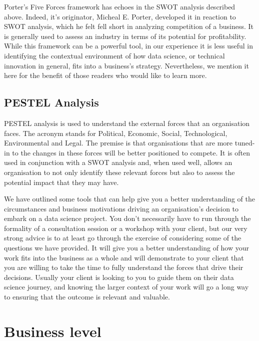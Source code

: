\documentclass[
]{book}
\begin{document}
Porter's Five Forces framework has echoes in the SWOT analysis described above. Indeed, it's originator, Micheal E. Porter, developed it in reaction to SWOT analysis, which he felt fell short in analyzing competition of a business. It is generally used to assess an industry in terms of its potential for profitability. While this framework can be a powerful tool, in our experience it is less useful in identifying the contextual environment of how data science, or technical innovation in general, fits into a business's strategy. Nevertheless, we mention it here for the benefit of those readers who would like to learn more.

\hypertarget{pestel-analysis}{%
\subsection{PESTEL Analysis}\label{pestel-analysis}}

PESTEL analysis is used to understand the external forces that an organisation faces. The acronym stands for Political, Economic, Social, Technological, Environmental and Legal. The premise is that organisations that are more tuned-in to the changes in these forces will be better positioned to compete. It is often used in conjunction with a SWOT analysis and, when used well, allows an organisation to not only identify these relevant forces but also to assess the potential impact that they may have.

We have outlined some tools that can help give you a better understanding of the circumstances and business motivations driving an organisation's decision to embark on a data science project. You don't necessarily have to run through the formality of a consultation session or a workshop with your client, but our very strong advice is to at least go through the exercise of considering some of the questions we have provided. It will give you a better understanding of how your work fits into the business as a whole and will demonstrate to your client that you are willing to take the time to fully understand the forces that drive their decisions. Usually your client is looking to you to guide them on their data science journey, and knowing the larger context of your work will go a long way to ensuring that the outcome is relevant and valuable.

\hypertarget{business-level}{%
\section{Business level}\label{business-level}}
\end{document}
